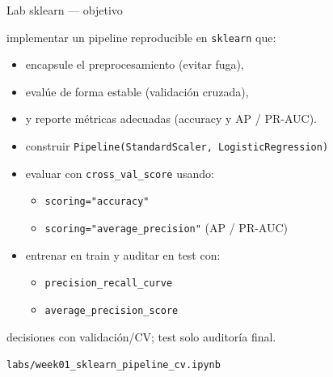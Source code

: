 \begin{frame}{Lab sklearn — objetivo}

\footnotesize
\vspace{0.3em}
 implementar un pipeline reproducible en \texttt{sklearn} que:
\begin{itemize}\setlength{\itemsep}{0.25em}
  \item encapsule el preprocesamiento (evitar fuga),
  \item evalúe de forma estable (validación cruzada),
  \item y reporte métricas adecuadas (accuracy y AP / PR-AUC).
\end{itemize}

\vspace{0.2em}
\begin{itemize}\setlength{\itemsep}{0.15em}
  \item construir \texttt{Pipeline(StandardScaler, LogisticRegression)}
  \item evaluar con \texttt{cross\_val\_score} usando:
  \begin{itemize}\setlength{\itemsep}{0.1em}
    \item \texttt{scoring="accuracy"}
    \item \texttt{scoring="average\_precision"} (AP / PR-AUC)
  \end{itemize}
  \item entrenar en train y auditar en test con:
  \begin{itemize}\setlength{\itemsep}{0.1em}
    \item \texttt{precision\_recall\_curve}
    \item \texttt{average\_precision\_score}
  \end{itemize}
\end{itemize}

\vspace{0.1em}
 decisiones con validación/CV; test solo auditoría final.

\vspace{0.1em}
 \texttt{labs/week01\_sklearn\_pipeline\_cv.ipynb}
\end{frame}

